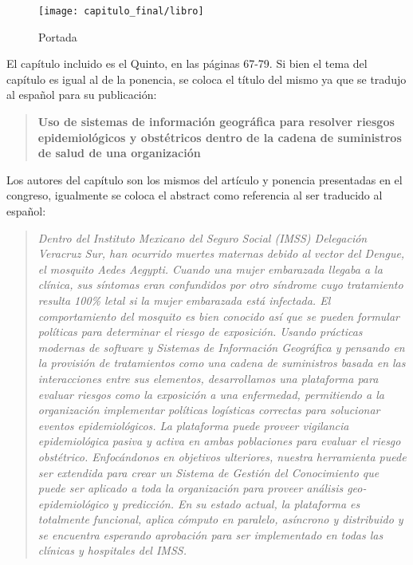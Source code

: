 \begin{figure}[H]
    \centering
    \texttt{[image: capitulo\_final/libro]}
    \caption{Portada}\label{fig:libro}
\end{figure}

El capítulo incluido es el Quinto, en las páginas 67-79. Si bien el tema del
capítulo es igual al de la ponencia, se coloca el título del mismo ya que se
tradujo al español para su publicación:

\begin{quote}
\textbf{Uso de sistemas de información geográfica para resolver riesgos
    epidemiológicos y obstétricos dentro de la cadena de suministros de salud de
    una organización}
\end{quote}

Los autores del capítulo son los mismos del artículo y ponencia presentadas en
el congreso, igualmente se coloca el abstract como referencia al ser traducido
al español:

\begin{quote}
\emph{Dentro del Instituto Mexicano del Seguro Social (IMSS) Delegación Veracruz Sur,
han ocurrido muertes maternas debido al vector del Dengue, el mosquito Aedes
Aegypti. Cuando una mujer embarazada llegaba a la clínica, sus síntomas eran
confundidos por otro síndrome cuyo tratamiento resulta 100\% letal si la mujer
embarazada está infectada. El comportamiento del mosquito es bien conocido así
que se pueden formular políticas para determinar el riesgo de exposición. Usando
prácticas modernas de software y Sistemas de Información Geográfica y pensando
en la provisión de tratamientos como una cadena de suministros basada en las
interacciones entre sus elementos, desarrollamos una plataforma para evaluar
riesgos como la exposición a una enfermedad, permitiendo a la organización
implementar políticas logísticas correctas para solucionar eventos
epidemiológicos. La plataforma puede proveer vigilancia epidemiológica pasiva y
activa en ambas poblaciones para evaluar el riesgo obstétrico. Enfocándonos en
objetivos ulteriores, nuestra herramienta puede ser extendida para crear un
Sistema de Gestión del Conocimiento que puede ser aplicado a toda la
organización para proveer análisis geo-epidemiológico y predicción. En su estado
actual, la plataforma es totalmente funcional, aplica cómputo en paralelo,
asíncrono y distribuido y se encuentra esperando aprobación para ser
implementado en todas las clínicas y hospitales del IMSS.}
\end{quote}


